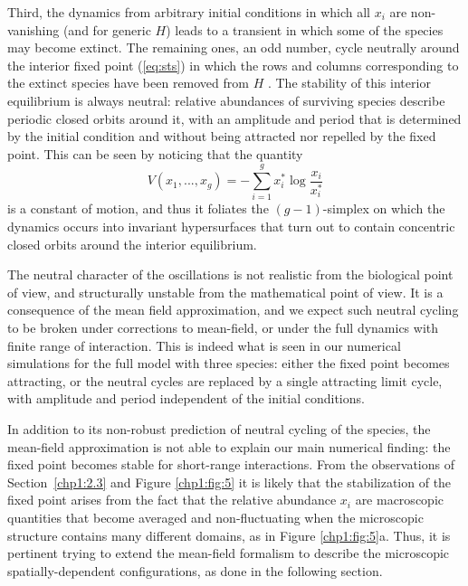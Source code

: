 Third, the dynamics from arbitrary initial conditions in which
all $x_i$ are non-vanishing (and for generic $H$) leads to a
transient in which some of the species may become extinct. The
remaining ones, an odd number, cycle neutrally around the
interior fixed point (\ref{eq:sts}) in which the rows and
columns corresponding to the extinct species have been removed
from $H$ \cite{Grilli2017Higher-orderModels}. The stability of
this interior equilibrium is always neutral: relative
abundances of surviving species describe periodic closed orbits
around it, with an amplitude and period that is determined by
the initial condition and without being attracted nor repelled
by the fixed point. This can be seen
 \cite{Grilli2017Higher-orderModels} by noticing that the
quantity
\begin{equation}
V(x_1,...,x_g) = - \sum_{i=1}^g x_i^* \log \frac{x_i}{x_i^*}
\end{equation}
is a constant of motion, and thus it foliates the
$(g-1)$-simplex on which the dynamics occurs into invariant
hypersurfaces that turn out to contain concentric closed orbits
around the interior equilibrium.

The neutral character of the oscillations is not realistic from
the biological point of view, and structurally unstable from
the mathematical point of view. It is a consequence of the mean
field approximation, and we expect such neutral cycling to be
broken under corrections to mean-field, or under the full
dynamics with finite range of interaction. This is indeed what
is seen in our numerical simulations for the full model with
three species: either the fixed point becomes attracting, or
the neutral cycles are replaced by a single attracting limit
cycle, with amplitude and period independent of the initial
conditions.

In addition to its non-robust prediction of neutral cycling of
the species, the mean-field approximation is not able to
explain our main numerical finding: the fixed point
becomes stable for short-range interactions. From the
observations of Section~\ref{chp1:2.3} and Figure
\ref{chp1:fig:5} it is likely that the stabilization of the
fixed point arises from the fact that the relative abundance
$x_i$ are macroscopic quantities that become averaged and
non-fluctuating when the microscopic structure contains many
different domains, as in Figure \ref{chp1:fig:5}a. Thus,
it is pertinent trying to extend the mean-field formalism to
describe the microscopic spatially-dependent configurations, as
done in the following section.


